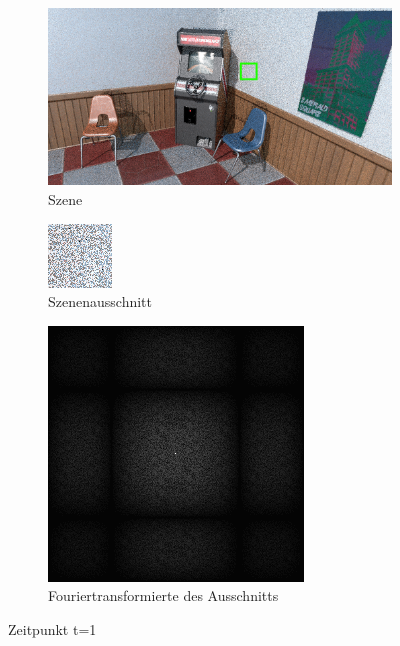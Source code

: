 \label{fig:Retargetbilderstrecke}
\begin{figure}[H]

    \begin{subfigure}{\textwidth}
        \centering \includegraphics[scale=.25]{content/TemporalerAlg/Bilder/Retargeting/Szene/Szene1.png}
        \caption{Szene}
        \label{fig:Retargeting_And_Sorting_Szene_t1}
    \end{subfigure}
    \begin{subfigure}{0.5\textwidth}
        \centering \includegraphics[width=0.4\linewidth]{content/TemporalerAlg/Bilder/Retargeting/Ausschnitt/Ausschnitt1.png} 
        \caption{Szenenausschnitt}
        \label{fig:Retargeting_And_Sorting_ausschnitt_t1}
    \end{subfigure}
    \begin{subfigure}{0.5\textwidth}
        \centering \includegraphics[width=0.4\linewidth]{content/TemporalerAlg/Bilder/Retargeting/Spektren/Ausschnitt1.png}
        \caption{Fouriertransformierte des Ausschnitts}
        \label{fig:Retargeting_And_Sorting_Fouriertransformierte_t1}
    \end{subfigure}
        \caption{Zeitpunkt t=1}
        \label{fig:Retargeting_And_Sorting_Verlauf_t1}
\end{figure}

